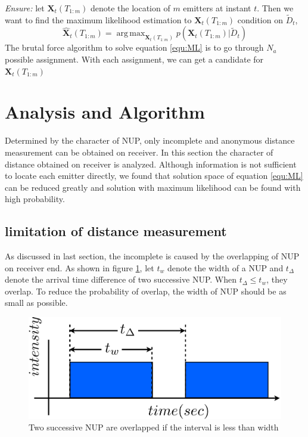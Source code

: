 \documentclass[conference]{IEEEtran}
\DeclareMathOperator*{\argmax}{arg\,max}
\begin{document}
\emph{Ensure:} let $\mathbf{X}_t(T_{1:m})$ denote the location of $m$ emitters
at instant $t$. Then we want to find the maximum likelihood estimation to
$\mathbf{X}_t(T_{1:m})$ condition on $\tilde{D}_t$, 
\begin{equation}
    \hat{\mathbf{X}}_t(T_{1:m})=\argmax_{\mathbf{X}_t(T_{1:m})} p(\mathbf{X}_t(T_{1:m})|\tilde{D}_t)
    \label{equ:ML}
\end{equation}
The brutal force algorithm to solve equation \ref{equ:ML} is to go through $N_a$
possible assignment. With each assignment, we can get a candidate for
$\mathbf{X}_t(T_{1:m})$ 

\section{Analysis and Algorithm}
Determined by the character of NUP, only incomplete and anonymous distance measurement
can be obtained on receiver. In this section the character of distance obtained on
receiver is analyzed. Although information is not sufficient to locate each emitter
directly, we found that solution space of equation \ref{equ:ML} can be reduced greatly and
solution with maximum likelihood can be found with high probability. 

\subsection{limitation of distance measurement}
As discussed in last section, the incomplete is caused by the overlapping of NUP on
receiver end. As shown in figure \ref{fig:overlap}, let $t_w$ denote the width of a NUP
and  $t_\Delta$ denote the arrival time difference of two successive NUP. When
$t_\Delta\le t_w$, they overlap. To reduce the probability of overlap, the width of NUP
should be as small as possible.
\begin{figure}[htpb]
    \begin{center}
	\includegraphics[width=.25\textwidth]{overlap}
    \end{center}
    \caption{Two successive NUP are overlapped if the interval is less than width }
    \label{fig:overlap}
\end{figure}
 
\end{document}
